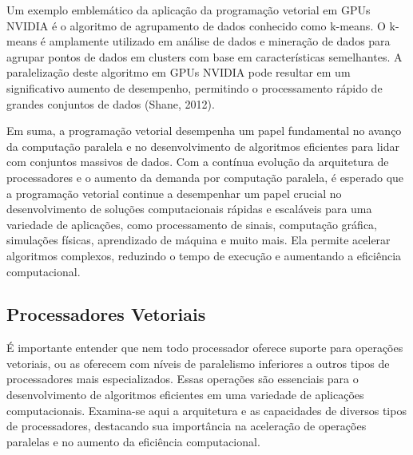 \documentclass[12pt,
openright, 
oneside, %
a4paper,    %
brazil]{facom-ufu-abntex2}
\begin{document}
Um exemplo emblemático da aplicação da programação vetorial em GPUs NVIDIA é o algoritmo de agrupamento de dados conhecido como k-means. O k-means é amplamente utilizado em análise de dados e mineração de dados para agrupar pontos de dados em clusters com base em características semelhantes. A paralelização deste algoritmo em GPUs NVIDIA pode resultar em um significativo aumento de desempenho, permitindo o processamento rápido de grandes conjuntos de dados (Shane, 2012).

Em suma, a programação vetorial desempenha um papel fundamental no avanço da computação paralela e no desenvolvimento de algoritmos eficientes para lidar com conjuntos massivos de dados. Com a contínua evolução da arquitetura de processadores e o aumento da demanda por computação paralela, é esperado que a programação vetorial continue a desempenhar um papel crucial no desenvolvimento de soluções computacionais rápidas e escaláveis para uma variedade de aplicações, como processamento de sinais, computação gráfica, simulações físicas, aprendizado de máquina e muito mais. Ela permite acelerar algoritmos complexos, reduzindo o tempo de execução e aumentando a eficiência computacional.






\subsection{Processadores Vetoriais}
\label{ssc:vetorial}

É importante entender que nem todo processador oferece suporte para operações vetoriais, ou as oferecem com níveis de paralelismo inferiores a outros tipos de processadores mais especializados. Essas operações são essenciais para o desenvolvimento de algoritmos eficientes em uma variedade de aplicações computacionais. Examina-se aqui a arquitetura e as capacidades de diversos tipos de processadores, destacando sua importância na aceleração de operações paralelas e no aumento da eficiência computacional.
\end{document}
